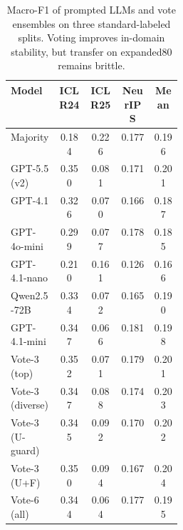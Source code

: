 \begin{table}[t]
\centering
\scriptsize
\setlength{\tabcolsep}{2pt}
\begin{tabular}{p{0.28\linewidth}cccc}
\toprule
Model & ICLR24 & ICLR25 & NeurIPS & Mean \\
\midrule
Majority & 0.184 & 0.226 & 0.177 & 0.196 \\
GPT-5.5 (v2) & 0.350 & 0.081 & 0.171 & 0.201 \\
GPT-4.1 & 0.326 & 0.070 & 0.166 & 0.187 \\
GPT-4o-mini & 0.299 & 0.077 & 0.178 & 0.185 \\
GPT-4.1-nano & 0.210 & 0.161 & 0.126 & 0.166 \\
Qwen2.5-72B & 0.334 & 0.072 & 0.165 & 0.190 \\
GPT-4.1-mini & 0.347 & 0.066 & 0.181 & 0.198 \\
\midrule
Vote-3 (top) & 0.352 & 0.071 & 0.179 & 0.201 \\
Vote-3 (diverse) & 0.347 & 0.088 & 0.174 & 0.203 \\
Vote-3 (U-guard) & 0.345 & 0.092 & 0.170 & 0.202 \\
Vote-3 (U+F) & 0.350 & 0.094 & 0.167 & 0.204 \\
Vote-6 (all) & 0.344 & 0.064 & 0.177 & 0.195 \\
\bottomrule
\end{tabular}
\caption{Macro-F1 of prompted LLMs and vote ensembles on three standard-labeled splits. Voting improves in-domain stability, but transfer on expanded80 remains brittle.}
\label{tab:prompted-llm-ensemble}
\end{table}
